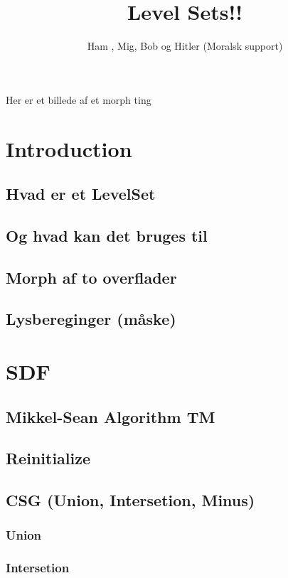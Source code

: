 \documentclass[a4paper]{memoir}
\title{Level Sets!!}
\author{Ham , Mig, Bob og Hitler (Moralsk support)}
\begin{document}
\maketitle{}

Her er et billede af et morph ting

\newpage

\tableofcontents{}

\chapter{Introduction}

\section{Hvad er et LevelSet}
\section{Og hvad kan det bruges til}

\section{Morph af to overflader}
\section{Lysbereginger (måske)}

\chapter{SDF}

\section{Mikkel-Sean Algorithm TM}

\section{Reinitialize}

\section{CSG (Union, Intersetion, Minus)}
\subsection{Union}
\subsection{Intersetion}
\end{document}
